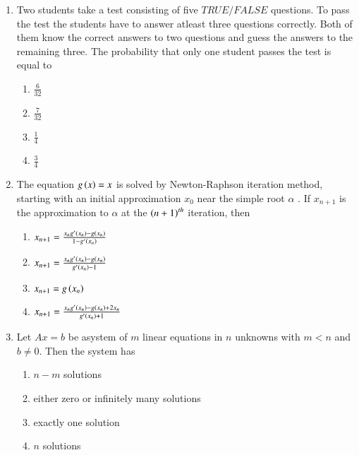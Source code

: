 \documentclass[journal]{IEEEtran}
\begin{document}
\begin{enumerate}
    \item Two students take a test consisting of five $TRUE / FALSE$ questions. To pass the test the students have to answer atleast three questions correctly. Both of them know the correct answers to two questions and guess the answers to the remaining three. The probability that only one student passes the test is equal to
        \begin{enumerate}
            \item $\frac{6}{32}$
            \item $\frac{7}{32}$
            \item $\frac{1}{4}$
            \item $\frac{3}{4}$
        \end{enumerate}

    \item The equation $g\left(x\right) = x$ is solved by Newton-Raphson iteration method, starting with an initial approximation $x_0$ near the simple root $\alpha$ . If $x_{n+1}$ is the approximation to $\alpha$ at the $\left(n+1\right)^{th}$ iteration, then
        \begin{enumerate}
            \item $x_{n+1} = \frac{x_n g^{\prime}\left(x_n\right)-g\left(x_n\right)}{1 - g^{\prime}\left(x_n\right)}$
            \item $x_{n+1} = \frac{x_n g^{\prime}\left(x_n\right)-g\left(x_n\right)}{g^{\prime}\left(x_n\right)-1}$
            \item $x_{n+1} = g\left(x_n\right)$
            \item $x_{n+1} = \frac{x_n g^{\prime}\left(x_n\right)-g\left(x_n\right)+ 2 x_n}{g^{\prime}\left(x_n\right)+1}$
        \end{enumerate}

    \item Let $Ax= b$ be asystem of $m$ linear equations in $n$ unknowns with $m< n$ and $b\neq0$. Then the system has
        \begin{enumerate}
            \item $n-m$ solutions
            \item either zero or infinitely many solutions
            \item exactly one solution
            \item $n$ solutions
        \end{enumerate}


\end{enumerate}
\end{document}
